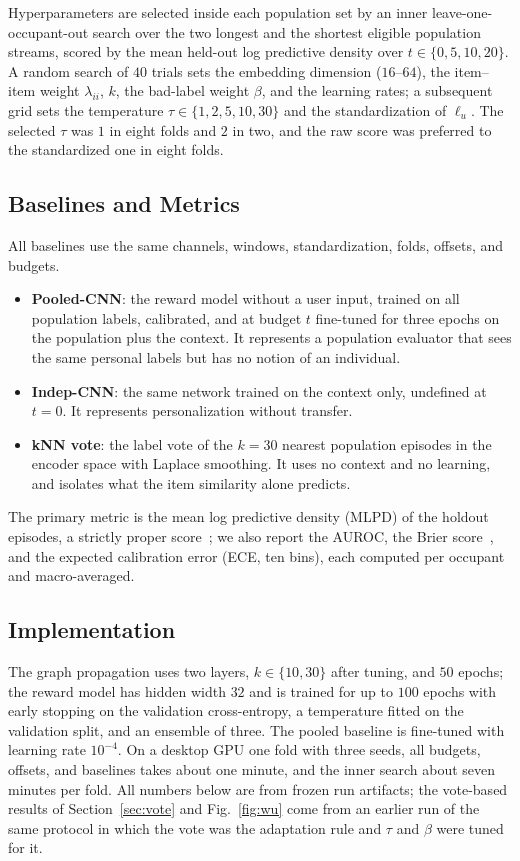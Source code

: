 \documentclass[conference]{IEEEtran}
\newif\ifdraftnotes
\newcommand{\draftnote}[1]{\ifdraftnotes\textcolor{red}{\textbf{[TODO: #1]}}\fi}
\begin{document}
Hyperparameters are selected inside each population set by an inner leave-one-occupant-out search over the two longest and the shortest eligible population streams, scored by the mean held-out log predictive density over $t\in\{0,5,10,20\}$. A random search of $40$ trials sets the embedding dimension ($16$--$64$), the item--item weight $\lambda_{ii}$, $k$, the bad-label weight $\beta$, and the learning rates; a subsequent grid sets the temperature $\tau\in\{1,2,5,10,30\}$ and the standardization of $\ell_u$. The selected $\tau$ was $1$ in eight folds and $2$ in two, and the raw score was preferred to the standardized one in eight folds.

\subsection{Baselines and Metrics}
\label{sec:baselines}

All baselines use the same channels, windows, standardization, folds, offsets, and budgets.
\begin{itemize}
  \item \textbf{Pooled-CNN}: the reward model without a user input, trained on all population labels, calibrated, and at budget $t$ fine-tuned for three epochs on the population plus the context. It represents a population evaluator that sees the same personal labels but has no notion of an individual.
  \item \textbf{Indep-CNN}: the same network trained on the context only, undefined at $t=0$. It represents personalization without transfer.
  \item \textbf{kNN vote}: the label vote of the $k=30$ nearest population episodes in the encoder space with Laplace smoothing. It uses no context and no learning, and isolates what the item similarity alone predicts.
\end{itemize}
The primary metric is the mean log predictive density (MLPD) of the holdout episodes, a strictly proper score~\cite{gneiting2007strictly}; we also report the AUROC, the Brier score~\cite{brier1950verification}, and the expected calibration error (ECE, ten bins), each computed per occupant and macro-averaged.

\subsection{Implementation}
\label{sec:implementation}

The graph propagation uses two layers, $k\in\{10,30\}$ after tuning, and $50$ epochs; the reward model has hidden width $32$ and is trained for up to $100$ epochs with early stopping on the validation cross-entropy, a temperature fitted on the validation split, and an ensemble of three. The pooled baseline is fine-tuned with learning rate $10^{-4}$. On a desktop GPU one fold with three seeds, all budgets, offsets, and baselines takes about one minute, and the inner search about seven minutes per fold. \draftnote{Hardware and software versions.} All numbers below are from frozen run artifacts; the vote-based results of Section~\ref{sec:vote} and Fig.~\ref{fig:wu} come from an earlier run of the same protocol in which the vote was the adaptation rule and $\tau$ and $\beta$ were tuned for it.
\end{document}
